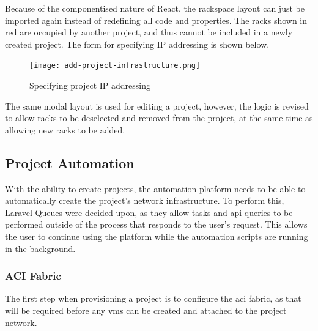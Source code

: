 Because of the componentised nature of React, the rackspace layout can just be imported again instead of redefining all code and properties. The racks shown in red are occupied by another project, and thus cannot be included in a newly created project. The form for specifying IP addressing is shown below.

\begin{figure}[H]
    \centering
    \texttt{[image: add-project-infrastructure.png]}
    \caption{Specifying project IP addressing}
    \label{fig:add-project-infrastructure}
\end{figure}

The same modal layout is used for editing a project, however, the logic is revised to allow racks to be deselected and removed from the project, at the same time as allowing new racks to be added.

\subsection{Project Automation}
With the ability to create projects, the automation platform needs to be able to automatically create the project's network infrastructure. To perform this, Laravel Queues were decided upon, as they allow tasks and \gls{api} queries to be performed outside of the process that responds to the user's request. This allows the user to continue using the platform while the automation scripts are running in the background.

\subsubsection{ACI Fabric}
The first step when provisioning a project is to configure the \gls{aci} fabric, as that will be required before any \gls{vm}s can be created and attached to the project network.

